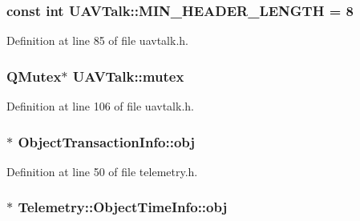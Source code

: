 \hypertarget{group___u_a_v_talk_plugin_ga0d20c7ff6e0eedb2ab1243c6bf957fd3}{
\subsubsection[{\-M\-I\-N\-\_\-\-H\-E\-A\-D\-E\-R\-\_\-\-L\-E\-N\-G\-T\-H}]{\setlength{\rightskip}{0pt plus 5cm}const int {\bf \-U\-A\-V\-Talk\-::\-M\-I\-N\-\_\-\-H\-E\-A\-D\-E\-R\-\_\-\-L\-E\-N\-G\-T\-H} = 8}}\label{group___u_a_v_talk_plugin_ga0d20c7ff6e0eedb2ab1243c6bf957fd3}


\-Definition at line 85 of file uavtalk.\-h.

\hypertarget{group___u_a_v_talk_plugin_ga2dea39cdabf26ef85d0b26583e21e60b}{
\subsubsection[{mutex}]{\setlength{\rightskip}{0pt plus 5cm}\-Q\-Mutex$\ast$ {\bf \-U\-A\-V\-Talk\-::mutex}}}\label{group___u_a_v_talk_plugin_ga2dea39cdabf26ef85d0b26583e21e60b}


\-Definition at line 106 of file uavtalk.\-h.

\hypertarget{group___u_a_v_talk_plugin_ga9ad43239e470da9249f214e43521bddb}{
\subsubsection[{obj}]{$\ast$ {\bf \-Object\-Transaction\-Info\-::obj}}}\label{group___u_a_v_talk_plugin_ga9ad43239e470da9249f214e43521bddb}


\-Definition at line 50 of file telemetry.\-h.

\hypertarget{group___u_a_v_talk_plugin_ga5dc98fd0fc9c63da03a2468969adb919}{
\subsubsection[{obj}]{$\ast$ \-Telemetry\-::\-Object\-Time\-Info\-::obj}}\label{group___u_a_v_talk_plugin_ga5dc98fd0fc9c63da03a2468969adb919}


